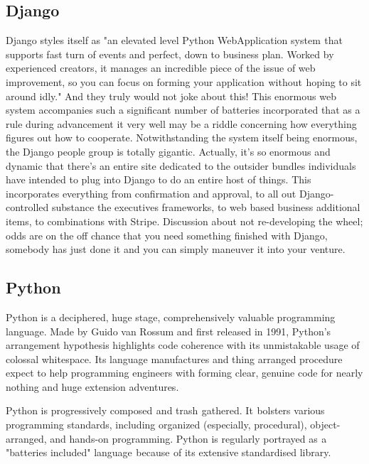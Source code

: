 \documentclass[oneside,12pt]{Classes/VTU}
\begin{document}
	\subsection{Django}
	Django styles itself as "an elevated level Python WebApplication system\tiny\textcolor{white}{s}\normalsize that supports fast turn of events and perfect, down to business plan. Worked by experienced creators, it manages an incredible piece of the issue of web improvement, so you can focus on forming your application\tiny\textcolor{white}{s}\normalsize without\tiny\textcolor{white}{s}\normalsize hoping to sit around idly." And they truly would not joke about this! This enormous web system accompanies such a significant number of batteries incorporated that as a rule during advancement it very well may be a riddle concerning how everything figures out how to cooperate. Notwithstanding the system itself being enormous, the Django people group is totally gigantic. Actually, it's so enormous and dynamic that there's an entire site dedicated to the outsider bundles individuals have intended to plug into Django to do an entire host of things. This incorporates everything from confirmation and approval, to all out Django-controlled substance the executives frameworks, to web based business additional items, to combinations with Stripe. Discussion about not re-developing the wheel; odds are on the off chance that you need something finished with Django, somebody has just done it and you can simply maneuver it into your venture.
	\subsection{Python}
	Python is a deciphered, huge stage, comprehensively valuable programming language. Made by Guido van Rossum and first released in 1991, Python's arrangement hypothesis highlights code coherence with its unmistakable usage of colossal whitespace. Its language manufactures and thing arranged procedure expect to help programming engineers with forming clear, genuine code for nearly nothing and huge extension adventures.
	
	Python is progressively composed\tiny\textcolor{white}{s}\normalsize and trash\tiny\textcolor{white}{s}\normalsize gathered. It\tiny\textcolor{white}{s}\normalsize bolsters various programming standards, including organized (especially, procedural), object-arranged, and hands-on programming. Python is regularly portrayed as\tiny\textcolor{white}{s}\normalsize a "batteries included" language\tiny\textcolor{white}{s}\normalsize because\tiny\textcolor{white}{s}\normalsize of its extensive standardised library. 
	
\end{document}

